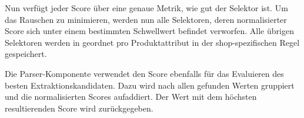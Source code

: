 Nun verfügt jeder Score über eine genaue Metrik, wie gut der Selektor ist.
Um das Rauschen zu minimieren, werden nun alle Selektoren, deren normalisierter Score sich unter einem bestimmten
Schwellwert befindet verworfen.
Alle übrigen Selektoren werden in geordnet pro Produktattribut in der shop-spezifischen Regel gespeichert.

Die Parser-Komponente verwendet den Score ebenfalls für das Evaluieren des besten Extraktionskandidaten.
Dazu wird nach allen gefunden Werten gruppiert und die normalisierten Scores aufaddiert.
Der Wert mit dem höchsten resultierenden Score wird zurückgegeben.

